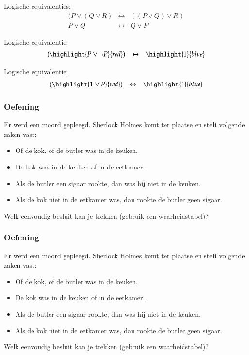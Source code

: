 \documentclass[dutch]{../khlslides}
\newcommand{\OR}{\vee}
\newcommand{\IFF}{\leftrightarrow}
\newcommand{\NOT}{\neg}
\begin{document}
{\begin{frame}
\begin{overprint}
      Logische equivalenties:
      \[
        \begin{array}{rcl}
          (P \OR (Q \OR R) & \IFF & ((P \OR Q) \OR R) \\
          P \OR Q & \IFF & Q \OR P
        \end{array}
      \]

      Logische equivalentie:
      \[
        \begin{array}{rcl}
          (\highlight{P \OR \NOT P}{red}) & \IFF & \highlight{1}{blue}
        \end{array}
      \]

      Logische equivalentie:
      \[
        \begin{array}{rcl}
          (\highlight{1 \OR P}{red}) & \IFF & \highlight{1}{blue}
        \end{array}
      \]
    \end{overprint}
  \end{frame}
}

\begin{frame}
  \frametitle{Oefening}
  Er werd een moord gepleegd. Sherlock Holmes komt ter plaatse en
  stelt volgende zaken vast:
  \begin{itemize}
    \item Of de kok, of de butler was in de keuken.
    \item De kok was in de keuken of in de eetkamer.
    \item Als de butler een sigaar rookte, dan was hij niet in de keuken.
    \item Als de kok niet in de eetkamer was, dan rookte de butler geen sigaar.
  \end{itemize}
  Welk eenvoudig besluit kan je trekken (gebruik een waarheidstabel)?
\end{frame}

\begin{frame}
  \frametitle{Oefening}
  Er werd een moord gepleegd. Sherlock Holmes komt ter plaatse en
  stelt volgende zaken vast:
  \begin{itemize}
    \item Of de kok, of de butler was in de keuken.
    \item De kok was in de keuken of in de eetkamer.
    \item Als de butler een sigaar rookte, dan was hij niet in de keuken.
    \item Als de kok niet in de eetkamer was, dan rookte de butler geen sigaar.
  \end{itemize}
  Welk eenvoudig besluit kan je trekken (gebruik een waarheidstabel)?
\end{frame}
\end{document}
